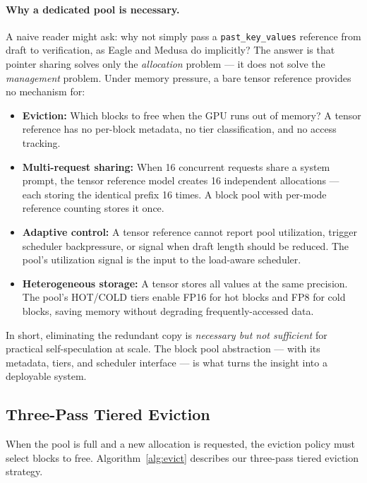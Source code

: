 \documentclass[review]{elsarticle}
\theoremstyle{definition}
\theoremstyle{remark}
\begin{document}
\paragraph{Why a dedicated pool is necessary.}
A naive reader might ask: why not simply pass a \texttt{past\_key\_values}
reference from draft to verification, as Eagle and Medusa do implicitly?
The answer is that pointer sharing solves only the \emph{allocation} problem
--- it does not solve the \emph{management} problem. Under memory pressure,
a bare tensor reference provides no mechanism for:
\begin{itemize}
    \item \textbf{Eviction:} Which blocks to free when the GPU runs out of
    memory? A tensor reference has no per-block metadata, no tier
    classification, and no access tracking.
    \item \textbf{Multi-request sharing:} When 16 concurrent requests share
    a system prompt, the tensor reference model creates 16 independent
    allocations --- each storing the identical prefix 16 times.
    A block pool with per-mode reference counting stores it once.
    \item \textbf{Adaptive control:} A tensor reference cannot report pool
    utilization, trigger scheduler backpressure, or signal when draft length
    should be reduced. The pool's utilization signal is the input to the
    load-aware scheduler.
    \item \textbf{Heterogeneous storage:} A tensor stores all values at the
    same precision. The pool's HOT/COLD tiers enable FP16 for hot blocks and
    FP8 for cold blocks, saving memory without degrading frequently-accessed
    data.
\end{itemize}
In short, eliminating the redundant copy is \emph{necessary but not
sufficient} for practical self-speculation at scale. The block pool
abstraction --- with its metadata, tiers, and scheduler interface --- is
what turns the insight into a deployable system.

\subsection{Three-Pass Tiered Eviction}
\label{sec:eviction}

When the pool is full and a new allocation is requested, the eviction
policy must select blocks to free. Algorithm~\ref{alg:evict} describes
our three-pass tiered eviction strategy.
\end{document}
